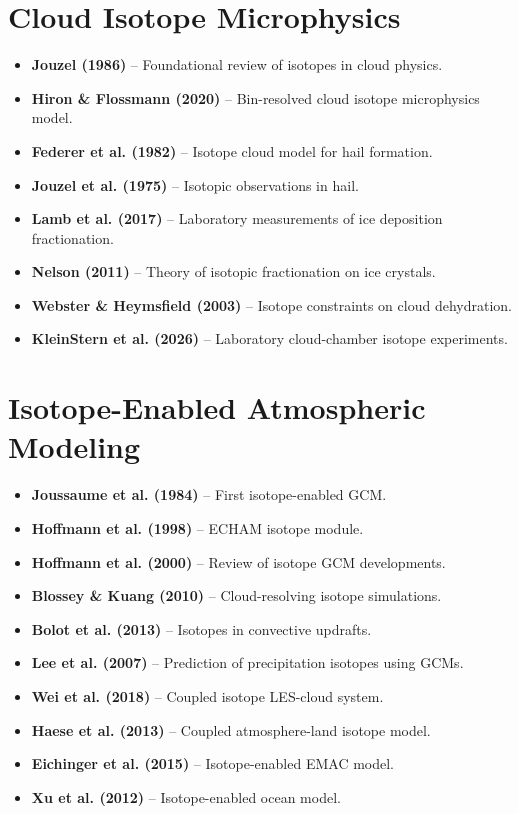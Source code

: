 \documentclass[11pt,a4paper]{article}
\begin{document}
\section{Cloud Isotope Microphysics}
\begin{itemize}
    \item \textbf{Jouzel (1986)} -- Foundational review of isotopes in cloud physics.
    \item \textbf{Hiron \& Flossmann (2020)} -- Bin-resolved cloud isotope microphysics model.
    \item \textbf{Federer et al. (1982)} -- Isotope cloud model for hail formation.
    \item \textbf{Jouzel et al. (1975)} -- Isotopic observations in hail.
    \item \textbf{Lamb et al. (2017)} -- Laboratory measurements of ice deposition fractionation.
    \item \textbf{Nelson (2011)} -- Theory of isotopic fractionation on ice crystals.
    \item \textbf{Webster \& Heymsfield (2003)} -- Isotope constraints on cloud dehydration.
    \item \textbf{KleinStern et al. (2026)} -- Laboratory cloud-chamber isotope experiments.
\end{itemize}

\section{Isotope-Enabled Atmospheric Modeling}


\begin{itemize}
    \item \textbf{Joussaume et al. (1984)} -- First isotope-enabled GCM.
    \item \textbf{Hoffmann et al. (1998)} -- ECHAM isotope module.
    \item \textbf{Hoffmann et al. (2000)} -- Review of isotope GCM developments.
    \item \textbf{Blossey \& Kuang (2010)} -- Cloud-resolving isotope simulations.
    \item \textbf{Bolot et al. (2013)} -- Isotopes in convective updrafts.
    \item \textbf{Lee et al. (2007)} -- Prediction of precipitation isotopes using GCMs.
    \item \textbf{Wei et al. (2018)} -- Coupled isotope LES-cloud system.
    \item \textbf{Haese et al. (2013)} -- Coupled atmosphere-land isotope model.
    \item \textbf{Eichinger et al. (2015)} -- Isotope-enabled EMAC model.
    \item \textbf{Xu et al. (2012)} -- Isotope-enabled ocean model.
\end{itemize}
\end{document}
